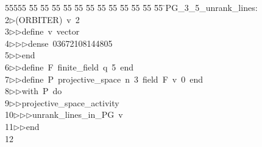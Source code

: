 %
%
\begin{tabbing}
55555 \= 55 \= 55 \= 55 \= 55 \= 55 \= 55 \= 55 \= 55 \= 55 \= 55 \= 55 \= 55 \= \>PG\_3\_5\_unrank\_lines:\\[0pt]
2\>$\triangleright$\>(ORBITER)\ v\ 2\ \\[0pt]
3\>$\triangleright$\>$\triangleright$\>define\ v\ vector\ \\[0pt]
4\>$\triangleright$\>$\triangleright$\>$\triangleright$\>dense\ 03672108144805\ \\[0pt]
5\>$\triangleright$\>$\triangleright$\>end\ \\[0pt]
6\>$\triangleright$\>$\triangleright$\>define\ F\ finite\_field\ q\ 5\ end\ \\[0pt]
7\>$\triangleright$\>$\triangleright$\>define\ P\ projective\_space\ n\ 3\ field\ F\ v\ 0\ end\ \\[0pt]
8\>$\triangleright$\>$\triangleright$\>with\ P\ do\ \\[0pt]
9\>$\triangleright$\>$\triangleright$\>projective\_space\_activity\ \\[0pt]
10\>$\triangleright$\>$\triangleright$\>$\triangleright$\>unrank\_lines\_in\_PG\ v\ \\[0pt]
11\>$\triangleright$\>$\triangleright$\>end\\[0pt]
12\>\end{tabbing}
